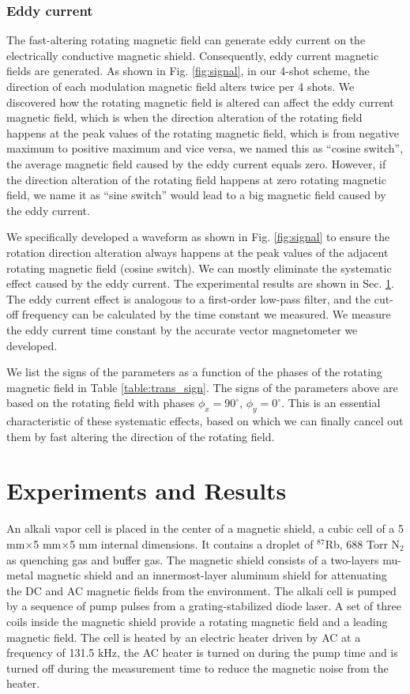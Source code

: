 \documentclass[prx,twocolumn,10pt,nofootinbib]{revtex4-1}
\begin{document}
\subsubsection{Eddy current}
The fast-altering rotating magnetic field can generate eddy current on the electrically conductive magnetic shield. Consequently, eddy current magnetic fields are generated. As shown in Fig. \ref{fig:signal}, in our 4-shot scheme, the direction of each modulation magnetic field alters twice per 4 shots. We discovered how the rotating magnetic field is altered can affect the eddy current magnetic field, which is when the direction alteration of the rotating field happens at the peak values of the rotating magnetic field, which is from negative maximum to positive maximum and vice versa, we named this as ``cosine switch'', the average magnetic field caused by the eddy current equals zero. However, if the direction alteration of the rotating field happens at zero rotating magnetic field, we name it as ``sine switch''  would lead to a big magnetic field caused by the eddy current. 

We specifically developed a waveform as shown in Fig. \ref{fig:signal} to ensure the rotation direction alteration always happens at the peak values of the adjacent rotating magnetic field (cosine switch). We can mostly eliminate the systematic effect caused by the eddy current. The experimental results are shown in Sec. \ref{sec:experiemt}. The eddy current effect is analogous to a first-order low-pass filter, and the cut-off frequency can be calculated by the time constant we measured. We measure the eddy current time constant by the accurate vector magnetometer we developed. 

We list the signs of the parameters as a function of the phases of the rotating magnetic field in Table \ref{table:trans_sign}. The signs of the parameters above are based on the rotating field with phases $\phi_x=90^{\circ}$, $\phi_y=0^{\circ}$. This is an essential characteristic of these systematic effects, based on which we can finally cancel out them by fast altering the direction of the rotating field. 

\section{Experiments and Results}\label{sec:experiemt}
An alkali vapor cell is placed in the center of a magnetic shield, a cubic cell of a 5 mm$\times$5 mm$\times$5 mm internal dimensions. It contains a droplet of $^{87}$Rb, 688 Torr N$_2$ as quenching gas and buffer gas. The magnetic shield consists of a two-layers mu-metal magnetic shield and an innermost-layer aluminum shield for attenuating the DC and AC magnetic fields from the environment. The alkali cell is pumped by a sequence of pump pulses from a grating-stabilized diode laser. A set of three coils inside the magnetic shield provide a rotating magnetic field and a leading magnetic field. The cell is heated by an electric heater driven by AC at a frequency of 131.5 kHz, the AC heater is turned on during the pump time and is turned off during the measurement time to reduce the magnetic noise from the heater.
\end{document}
